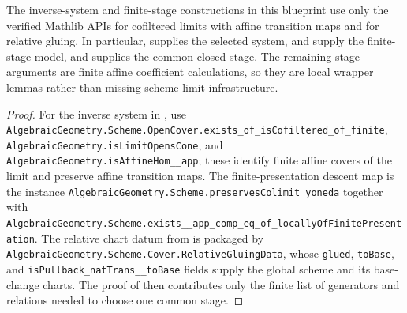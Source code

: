 \begin{lemma}
  \label{lemma:nagata-noetherian-current-api}

  The inverse-system and finite-stage constructions in this blueprint use only
  the verified Mathlib APIs for cofiltered limits with affine transition maps
  and for relative gluing.  In particular,
   supplies the selected system,
   and
   supply the finite-stage model,
  and  supplies the common
  closed stage.  The remaining stage arguments are finite affine coefficient
  calculations, so they are local wrapper lemmas rather than missing
  scheme-limit infrastructure.
\end{lemma}

\begin{proof}
  For the inverse system in
  , use
  \texttt{AlgebraicGeometry.Scheme.OpenCover.exists\_of\_isCofiltered\_of\_finite},
  \texttt{AlgebraicGeometry.isLimitOpensCone}, and
  \texttt{AlgebraicGeometry.isAffineHom\_\pi\_app}; these identify finite
  affine covers of the limit and preserve affine transition maps.  The
  finite-presentation descent map is the instance
  \texttt{AlgebraicGeometry.Scheme.preservesColimit\_yoneda} together with
  \texttt{AlgebraicGeometry.Scheme.exists\_\pi\_app\_comp\_eq\_of\_locallyOfFinitePresentation}.
  The relative chart datum from
   is packaged by
  \texttt{AlgebraicGeometry.Scheme.Cover.RelativeGluingData}, whose
  \texttt{glued}, \texttt{toBase}, and
  \texttt{isPullback\_natTrans\_\iota\_toBase} fields supply the global
  scheme and its base-change charts.  The proof of
   then contributes only the
  finite list of generators and relations needed to choose one common stage.
\end{proof}

